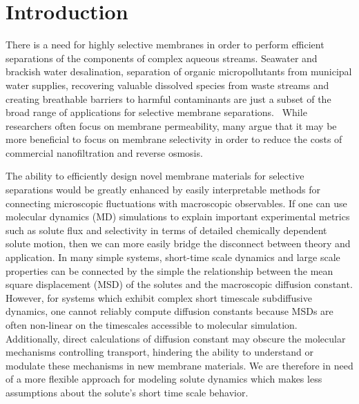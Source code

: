 \documentclass[journal=jpcbfk,manuscript=article]{achemso}
\begin{document}
  \section{Introduction}
  
  There is a need for highly selective membranes in order to perform efficient 
  separations of the components of complex aqueous streams. Seawater and
  brackish water desalination, separation of organic micropollutants from 
  municipal water supplies, recovering valuable dissolved species from 
  waste streams and creating breathable barriers to harmful contaminants are just a
  subset of the broad range of applications for selective membrane separations.~\cite{fritzmann_state---art_2007,fonseca_couto_critical_2018,dischinger_evaluation_2019,ramaseshan_functionalized_2006}
  While researchers often focus on membrane permeability, many argue that
  it may be more beneficial to focus on membrane selectivity in order to 
  reduce the costs of commercial nanofiltration and reverse osmosis.~\cite{werber_materials_2016}

  
  The ability to efficiently design novel membrane materials for
  selective separations would be greatly enhanced by easily
  interpretable methods for connecting microscopic fluctuations with
  macroscopic observables. If one can use molecular dynamics (MD)
  simulations to explain important experimental metrics such as solute
  flux and selectivity in terms of detailed chemically dependent
  solute motion, then we can more easily bridge the disconnect between
  theory and application. In many simple systems, short-time scale
  dynamics and large scale properties can be connected by the simple
  the relationship between the mean square displacement (MSD) of the
  solutes and the macroscopic diffusion constant.  However, for
  systems which exhibit complex short timescale subdiffusive dynamics,
  one cannot reliably compute diffusion constants because MSDs are often
  non-linear on the timescales accessible to molecular
  simulation. Additionally, direct calculations of diffusion constant
  may obscure the molecular mechanisms controlling transport,
  hindering the ability to understand or modulate these mechanisms in new membrane 
  materials. We are therefore in need of a more flexible approach for modeling solute 
  dynamics which makes less assumptions about the solute's short time scale behavior.
\end{document}
